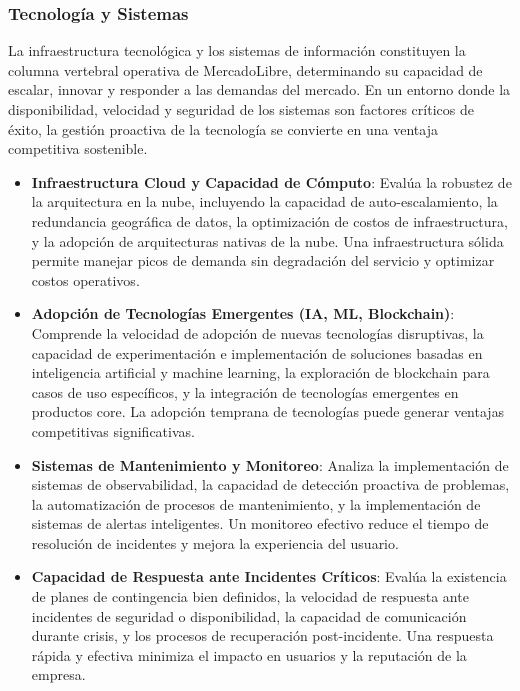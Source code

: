 \subsubsection{Tecnología y Sistemas}

La infraestructura tecnológica y los sistemas de información constituyen la columna vertebral operativa de MercadoLibre, determinando su capacidad de escalar, innovar y responder a las demandas del mercado. En un entorno donde la disponibilidad, velocidad y seguridad de los sistemas son factores críticos de éxito, la gestión proactiva de la tecnología se convierte en una ventaja competitiva sostenible.

\begin{itemize}
\item \textbf{Infraestructura Cloud y Capacidad de Cómputo}: Evalúa la robustez de la arquitectura en la nube, incluyendo la capacidad de auto-escalamiento, la redundancia geográfica de datos, la optimización de costos de infraestructura, y la adopción de arquitecturas nativas de la nube. Una infraestructura sólida permite manejar picos de demanda sin degradación del servicio y optimizar costos operativos.

\item \textbf{Adopción de Tecnologías Emergentes (IA, ML, Blockchain)}: Comprende la velocidad de adopción de nuevas tecnologías disruptivas, la capacidad de experimentación e implementación de soluciones basadas en inteligencia artificial y machine learning, la exploración de blockchain para casos de uso específicos, y la integración de tecnologías emergentes en productos core. La adopción temprana de tecnologías puede generar ventajas competitivas significativas.

\item \textbf{Sistemas de Mantenimiento y Monitoreo}: Analiza la implementación de sistemas de observabilidad, la capacidad de detección proactiva de problemas, la automatización de procesos de mantenimiento, y la implementación de sistemas de alertas inteligentes. Un monitoreo efectivo reduce el tiempo de resolución de incidentes y mejora la experiencia del usuario.

\item \textbf{Capacidad de Respuesta ante Incidentes Críticos}: Evalúa la existencia de planes de contingencia bien definidos, la velocidad de respuesta ante incidentes de seguridad o disponibilidad, la capacidad de comunicación durante crisis, y los procesos de recuperación post-incidente. Una respuesta rápida y efectiva minimiza el impacto en usuarios y la reputación de la empresa.
\end{itemize}

